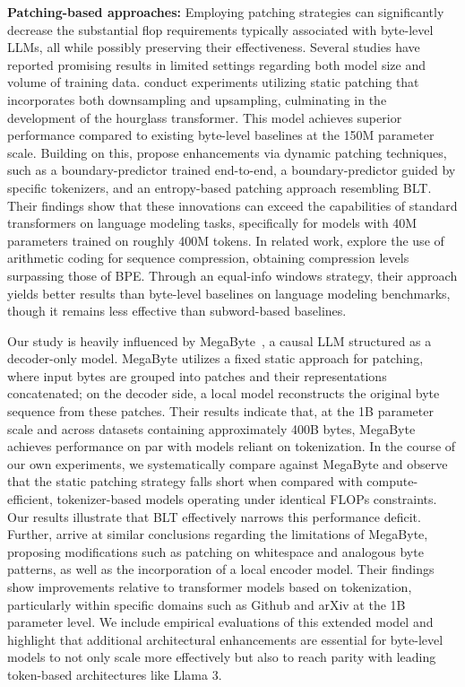 \textbf{Patching-based approaches:} Employing patching strategies can significantly decrease the substantial flop requirements typically associated with byte-level LLMs, all while possibly preserving their effectiveness. Several studies have reported promising results in limited settings regarding both model size and volume of training data. \cite{nawrot-etal-2022-hierarchical} conduct experiments utilizing static patching that incorporates both downsampling and upsampling, culminating in the development of the hourglass transformer. This model achieves superior performance compared to existing byte-level baselines at the 150M parameter scale. Building on this, \cite{nawrot-etal-2023-efficient} propose enhancements via dynamic patching techniques, such as a boundary-predictor trained end-to-end, a boundary-predictor guided by specific tokenizers, and an entropy-based patching approach resembling {\textsc BLT}. Their findings show that these innovations can exceed the capabilities of standard transformers on language modeling tasks, specifically for models with 40M parameters trained on roughly 400M tokens. In related work, \cite{lester2024training} explore the use of arithmetic coding for sequence compression, obtaining compression levels surpassing those of BPE. Through an equal-info windows strategy, their approach yields better results than byte-level baselines on language modeling benchmarks, though it remains less effective than subword-based baselines.

Our study is heavily influenced by MegaByte~\citep{yu2023megabyte}, a causal LLM structured as a decoder-only model. MegaByte utilizes a fixed static approach for patching, where input bytes are grouped into patches and their representations concatenated; on the decoder side, a local model reconstructs the original byte sequence from these patches. Their results indicate that, at the 1B parameter scale and across datasets containing approximately 400B bytes, MegaByte achieves performance on par with models reliant on tokenization. In the course of our own experiments, we systematically compare against MegaByte and observe that the static patching strategy falls short when compared with compute-efficient, tokenizer-based models operating under identical FLOPs constraints. Our results illustrate that {\textsc BLT} effectively narrows this performance deficit. Further, \cite{slagle2024spacebyte} arrive at similar conclusions regarding the limitations of MegaByte, proposing modifications such as patching on whitespace and analogous byte patterns, as well as the incorporation of a local encoder model. Their findings show improvements relative to transformer models based on tokenization, particularly within specific domains such as Github and arXiv at the 1B parameter level. We include empirical evaluations of this extended model and highlight that additional architectural enhancements are essential for byte-level models to not only scale more effectively but also to reach parity with leading token-based architectures like Llama 3.

